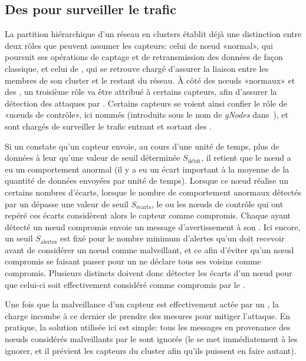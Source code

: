     \subsection{Des \cns pour surveiller le trafic}

La partition hiérarchique d'un réseau en clusters établit déjà une distinction entre deux rôles que peuvent assumer les capteurs: celui de nœud «normal», qui poursuit ses opérations de captage et de retransmission des données de façon classique, et celui de \ch, qui se retrouve chargé d'assurer la liaison entre les membres de son cluster et le restant du réseau.
À côté des nœuds «normaux» et des \chs, un troisième rôle va être attribué à certains capteurs, afin d'assurer la détection des attaques par \dds.
Certains capteurs se voient ainsi confier le rôle de «nœuds de contrôle», ici nommés \cns (introduits sous le nom de \textit{gNodes} dans~\cite{LC08}), et sont chargés de surveiller le trafic entrant et sortant des \chs.

Si un \cn constate qu'un capteur envoie, au cours d'une unité de temps, plus de données à leur \CH qu'une valeur de seuil déterminée $S_{\textrm{débit}}$, il retient que le nœud a eu un comportement anormal (il y a eu un écart important à la moyenne de la quantité de données envoyées par unité de temps).
Lorsque ce nœud réalise un certains nombres d'écarts, \cad lorsque le nombre de comportement anormaux détectés par un \cn dépasse une valeur de seuil $S_{\textrm{écarts}}$, le ou les nœuds de contrôle qui ont repéré ces écarts considèrent alors le capteur comme compromis.
Chaque \cn ayant détecté un nœud compromis envoie un message d'avertissement à son \ch.
Ici encore, un seuil $S_{\textrm{alertes}}$ est fixé pour le nombre minimum d'alertes qu'un \CH doit recevoir avant de considérer un nœud comme malveillant, et ce afin d'éviter qu'un nœud compromis se faisant passer pour un \cn ne déclare tous ses voisins comme compromis.
Plusieurs \cns distincts doivent donc détecter les écarts d'un nœud pour que celui-ci soit effectivement considéré comme compromis par le \ch.

Une fois que la malveillance d'un capteur est effectivement actée par un \ch, la charge incombe à ce dernier de prendre des mesures pour mitiger l'attaque.
En pratique, la solution utilisée ici est simple: tous les messages en provenance des nœuds considérés malveillants par le \ch sont ignorés (le \CH se met immédiatement à les ignorer, et il prévient les capteurs du cluster afin qu'ils puissent en faire autant).

